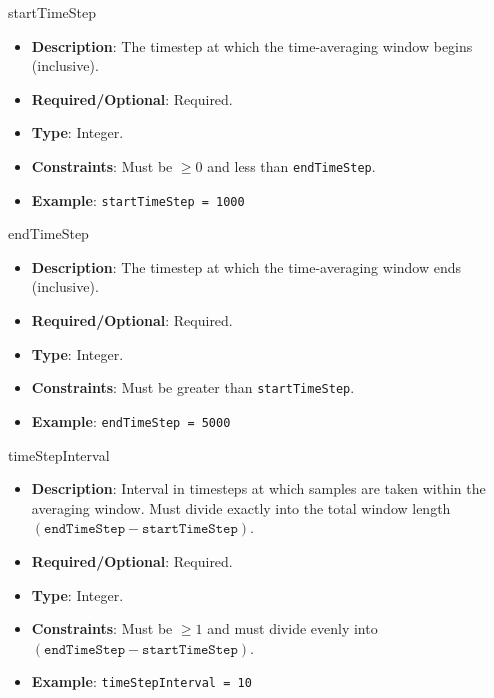 startTimeStep
\vspace{\the\parameterListSpacing}
\begin{itemize}
    \item {\bf Description}: The timestep at which the time-averaging window begins (inclusive).
    \item {\bf Required/Optional}: Required.
    \item {\bf Type}: Integer.
    \item {\bf Constraints}: Must be $\geq 0$ and less than \lstinline!endTimeStep!.
    \item {\bf Example}: \lstinline!startTimeStep = 1000!
\end{itemize}

endTimeStep
\vspace{\the\parameterListSpacing}
\begin{itemize}
    \item {\bf Description}: The timestep at which the time-averaging window ends (inclusive).
    \item {\bf Required/Optional}: Required.
    \item {\bf Type}: Integer.
    \item {\bf Constraints}: Must be greater than \lstinline!startTimeStep!.
    \item {\bf Example}: \lstinline!endTimeStep = 5000!
\end{itemize}

timeStepInterval
\vspace{\the\parameterListSpacing}
\begin{itemize}
    \item {\bf Description}: Interval in timesteps at which samples are taken within the averaging window. Must divide exactly into the total window length $(\mathtt{endTimeStep} - \mathtt{startTimeStep})$.
    \item {\bf Required/Optional}: Required.
    \item {\bf Type}: Integer.
    \item {\bf Constraints}: Must be $\geq 1$ and must divide evenly into $(\mathtt{endTimeStep} - \mathtt{startTimeStep})$.
    \item {\bf Example}: \lstinline!timeStepInterval = 10!
\end{itemize}
